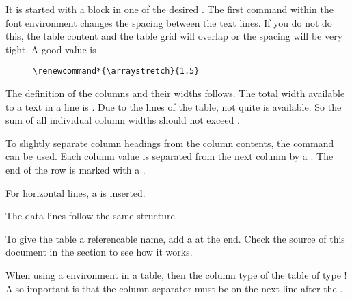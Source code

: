 It is started with a block in one of the desired .
The first command within the font environment changes the spacing between the
text lines. If you do not do this, the table content and the table grid will
overlap or the spacing will be very tight. A good value is

\begin{figure}[H]
    \small
    \centering
    \begin{BVerbatim}
\renewcommand*{\arraystretch}{1.5}
    \end{BVerbatim}
\end{figure}

The definition of the columns and their widths follows. The total width
available to a text in a line is . Due
to the lines of the table, not quite 
is available. So the sum of all individual column widths should not exceed
.
\bigbreak

To slightly separate column headings from the column contents, the\linebreak
{} command can be used. Each
column value is separated from the next column by a \tsTextMonospace{\&}. The end
of the row is marked with a \tsTextMonospace{\tsBackslash{}\tsBackslash{}}.
\bigbreak

For horizontal lines, a  is inserted.
\bigbreak

The data lines follow the same structure.
\bigbreak

To give the table a referencable name, add a
 at the end.
Check the source of this document in the section 
to see how it works.
\bigbreak

When using a  environment in a table, then the
column type of the table  of type !
Also important is that the column separator \tsTextMonospace{\&} must be on
the next line after the .
